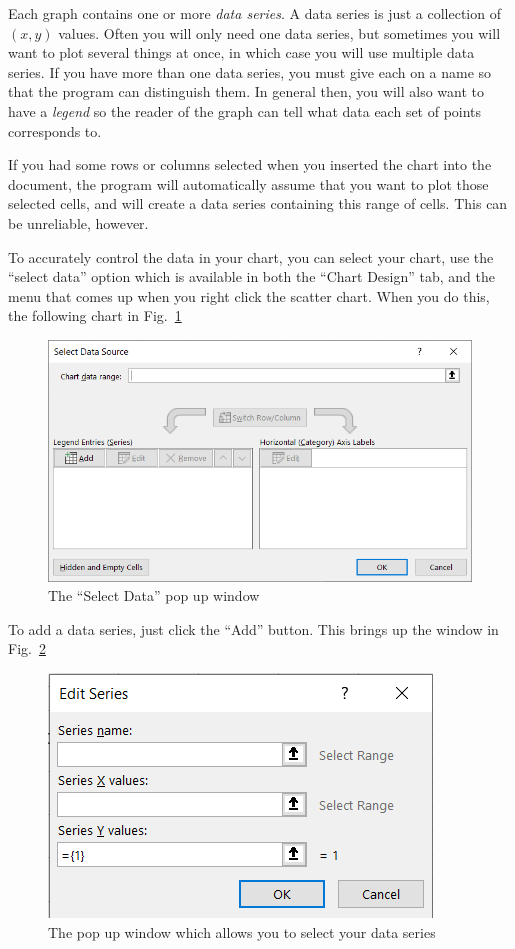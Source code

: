 \documentclass[10pt]{article}
\begin{document}
Each graph contains one or more \textit{data series}. A data series is just a collection of $\left( x,y \right)$ values. Often you will only need one data series, but sometimes you will want to plot several things at once, in which case you will use multiple data series. If you have more than one data series, you must give each on a name so that the program can distinguish them. In general then, you will also want to have a \textit{legend} so the reader of the graph can tell what data each set of points corresponds to. 

If you had some rows or columns selected when you inserted the chart into the document, the program will automatically assume that you want to plot those selected cells, and will create a data series containing this range of cells. This can be unreliable, however. 

To accurately control the data in your chart, you can select your chart, use the ``select data'' option which is available in both the ``Chart Design'' tab, and the menu that comes up when you right click the scatter chart. When you do this, the following chart in Fig.~\ref{fig:images_select-data}

\begin{figure}[htpb]
	\centering
	\includegraphics[width=0.5\linewidth]{images/select-data.png}
	\caption{The ``Select Data'' pop up window}%
	\label{fig:images_select-data}
\end{figure}

To add a data series, just click the ``Add'' button. This brings up the window in Fig.~\ref{fig:images_data-series-selector}

\begin{figure}[htpb]
	\centering
	\includegraphics[width=0.5\linewidth]{images/data-series-selector.png}
	\caption{The pop up window which allows you to select your data series}%
	\label{fig:images_data-series-selector}
\end{figure}
\end{document}
